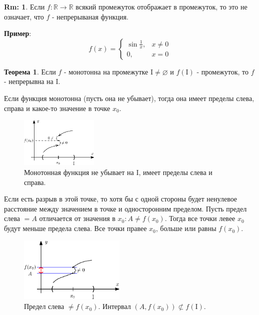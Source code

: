 \documentclass[12pt]{article}
\newcommand{\MR}{\mathbb{R}}
\newcommand{\MI}{\mathrm{I}}
\newcommand{\VN}{\varnothing}
\theoremstyle{definition}
\newtheorem{rem}{Rm:}
\newtheorem{theorem}{Теорема}
\begin{document}
\begin{rem}
	Если $f\colon \MR \to \MR$ всякий промежуток отображает в промежуток, то это не означает, что $f$ - непрерываная функция. 
\end{rem}

\textbf{Пример}: $$ f(x) = \begin{cases} 
	\sin{\frac{1}{x}}, & x \neq 0\\
	0, & x = 0
\end{cases}
$$

\begin{theorem}
	Если $f$ - монотонна на промежутке $\MI \neq \VN$ и $f(\MI)$ - промежуток, то $f$ - непрерывна на $\MI$.
\end{theorem}

Если функция монотонна (пусть она не убывает), тогда она имеет пределы слева, справа и какое-то значение в точке $x_0$.
\begin{figure}[H]
	\centering
	\includegraphics[width=0.33\textwidth]{19_1.eps}
	\caption{Монотонная функция не убывает на $\MI$, имеет пределы слева и справа.}
	\label{19_1}
\end{figure}

 Если есть разрыв в этой точке, то хотя бы с одной стороны будет ненулевое расстояние между значением в точке и односторонним пределом. Пусть предел слева $=A$ отличается от значения в $x_0 \colon A \neq f(x_0)$. Тогда все точки левее $x_0$ будут меньше предела слева. Все точки правее $x_0$, больше или равны $f(x_0)$.

\begin{figure}[H]
	\centering
	\includegraphics[width=0.45\textwidth]{19_2.eps}
	\caption{Предел слева $\neq f(x_0)$. Интервал $(A,f(x_0)) \not\subset f(\MI)$.}
	\label{19_2}
\end{figure}
\end{document}
